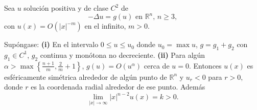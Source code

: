 



\begin{theorem}
Sea $u$ soluci\'{o}n positiva y de clase $C^{2}$ de
\begin{equation}
-\Delta u=g\left(  u\right)  \text{ \ \ en }\mathbb{R}^{n}\text{, }%
n\geq3,\tag{15}%
\end{equation}
con $u\left(  x\right)  =O\left(  \left\vert x\right\vert ^{-m}\right)  $ en
el infinito, $m>0$.

Sup\'{o}ngase: \textbf{(i)} En el intervalo $0\leq u\leq u_{0}$ donde
$u_{0}=\max u$, $g=g_{1}+g_{2}$ con $g_{1}\in C^{1}$, $g_{2}$ continua y
mon\'{o}tona no decreciente. \textbf{(ii)} Para alg\'{u}n \linebreak%
$\alpha>\max\left\{  \frac{n+1}{m},\frac{2}{m}+1\right\}  $, $g\left(
u\right)  =O\left(  u^{\alpha}\right)  $ cerca de $u=0$. Entonces $u\left(
x\right)  $ es esf\'{e}ricamente sim\'{e}trica alrededor de alg\'{u}n punto de
$\mathbb{R}^{n}$ y $u_{r}<0$ para $r>0,$ donde $r$ es la coordenada radial
alrededor de ese punto. Adem\'{a}s
\begin{equation}
\lim_{\left\vert x\right\vert \rightarrow\infty}\left\vert x\right\vert
^{n-2}u\left(  x\right)  =k>0\text{.}\tag{16}%
\end{equation}

\end{theorem}
